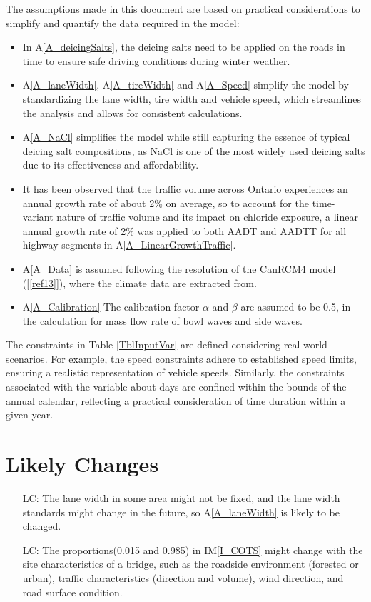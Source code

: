 \documentclass[12pt]{article}
\newcommand{\aref}[1]{A\ref{#1}}
\newcommand{\iref}[1]{IM\ref{#1}}
\newcounter{lcnum} %
\newcommand{\reref}[1]{\ref{#1}}
\begin{document}
The assumptions made in this document are based on practical considerations to simplify and quantify the data required in the model:
\begin{itemize} 
\item In \aref{A_deicingSalts}, the deicing salts need to be applied on the roads in time to ensure safe driving conditions during winter weather. 
\item \aref{A_laneWidth}, \aref{A_tireWidth} and \aref{A_Speed} simplify the model by standardizing the lane width, tire width and vehicle speed, which streamlines the analysis and allows for consistent calculations.
\item \aref{A_NaCl} simplifies the model while still capturing the essence of typical deicing salt compositions, as NaCl is one of the most widely used deicing salts due to its effectiveness and affordability.
\item It has been observed that the traffic volume across Ontario experiences an annual growth rate of about 2\% on average, so to account for the time-variant nature of traffic volume and its impact on chloride exposure, a linear annual growth rate of 2\% was applied to both AADT and AADTT for all highway segments in \aref{A_LinearGrowthTraffic}.
\item \aref{A_Data} is assumed following the resolution of the CanRCM4 model ([\reref{ref13}]), where the climate data are extracted from.
\item \aref{A_Calibration} The calibration factor $\alpha$ and $\beta$ are assumed to be 0.5, in the calculation for mass flow rate of bowl waves and side waves.

\end{itemize}

The constraints in Table \ref{TblInputVar} are defined considering real-world scenarios. For example,  the speed constraints adhere to established speed limits, ensuring a realistic representation of vehicle speeds. Similarly, the constraints associated with the variable about days are confined within the bounds of the annual calendar, reflecting a practical consideration of time duration within a given year.


\section{Likely Changes}    

\noindent \begin{itemize}

\item[LC\refstepcounter{lcnum}\thelcnum\label{LC_laneWidth}:] The lane width in some area might not be fixed, and the lane width standards might change in the future, so \aref{A_laneWidth} is likely to be changed. 
\item[LC\refstepcounter{lcnum}\thelcnum\label{LC_SASC}:] The proportions(0.015 and 0.985) in \iref{I_COTS} might change with the site characteristics of a bridge, such as the roadside environment (forested or urban), traffic characteristics (direction and volume), wind direction, and road surface condition. 

\end{itemize}
\end{document}
